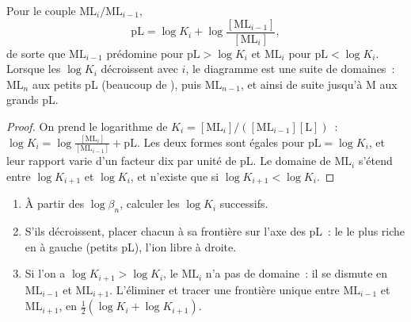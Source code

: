 \begin{proposition}[Frontières en pL]\label{prop:b1:complexation:pl-boundaries}
Pour le couple $\mathrm{ML}_i/\mathrm{ML}_{i-1}$,
\[
  \mathrm{pL} = \log K_i + \log\frac{[\mathrm{ML}_{i-1}]}{[\mathrm{ML}_i]} ,
\]
de sorte que $\mathrm{ML}_{i-1}$ prédomine pour $\mathrm{pL} > \log K_i$
et $\mathrm{ML}_i$ pour $\mathrm{pL} < \log K_i$. Lorsque les
$\log K_i$ décroissent avec $i$, le diagramme est une suite de
domaines~: $\mathrm{ML}_n$ aux petits pL (beaucoup de ), puis
$\mathrm{ML}_{n-1}$, et ainsi de suite jusqu'à M aux grands pL.
\end{proposition}

\begin{proof}
On prend le logarithme de $K_i = [\mathrm{ML}_i]/([\mathrm{ML}_{i-1}][\mathrm{L}])$~:
$\log K_i = \log\frac{[\mathrm{ML}_i]}{[\mathrm{ML}_{i-1}]} + \mathrm{pL}$.
Les deux formes sont égales pour $\mathrm{pL} = \log K_i$, et leur
rapport varie d'un facteur dix par unité de pL. Le domaine de
$\mathrm{ML}_i$ s'étend entre
$\log K_{i+1}$ et $\log K_i$, et n'existe que si $\log K_{i+1} < \log
K_i$.
\end{proof}

\begin{method}\label{met:b1:complexation:pl-diagram}
\begin{enumerate}
  \item À partir des $\log\beta_n$, calculer les $\log K_i$ successifs.
  \item S'ils décroissent, placer chacun à sa frontière sur l'axe des
        pL~: le  le plus riche en  à gauche (petits pL),
        l'ion libre à droite.
  \item Si l'on a $\log K_{i+1} > \log K_i$, le 
        $\mathrm{ML}_i$ n'a pas de domaine~: il se dismute en
        $\mathrm{ML}_{i-1}$ et
        $\mathrm{ML}_{i+1}$. L'éliminer et tracer une frontière unique
        entre $\mathrm{ML}_{i-1}$ et $\mathrm{ML}_{i+1}$, en
        $\frac12(\log K_i + \log K_{i+1})$.
\end{enumerate}
\end{method}

